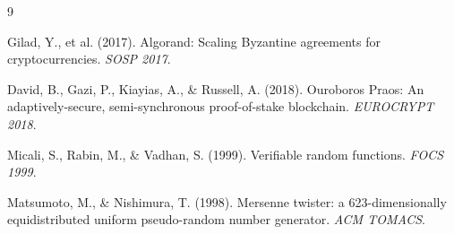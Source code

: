 \documentclass[11pt,letterpaper]{article}
\begin{document}

\begin{thebibliography}{9}

Gilad, Y., et al. (2017). Algorand: Scaling Byzantine agreements for cryptocurrencies. \textit{SOSP 2017}.

David, B., Gazi, P., Kiayias, A., \& Russell, A. (2018). Ouroboros Praos: An adaptively-secure, semi-synchronous proof-of-stake blockchain. \textit{EUROCRYPT 2018}.

Micali, S., Rabin, M., \& Vadhan, S. (1999). Verifiable random functions. \textit{FOCS 1999}.

Matsumoto, M., \& Nishimura, T. (1998). Mersenne twister: a 623-dimensionally equidistributed uniform pseudo-random number generator. \textit{ACM TOMACS}.

\end{thebibliography}
\end{document}
